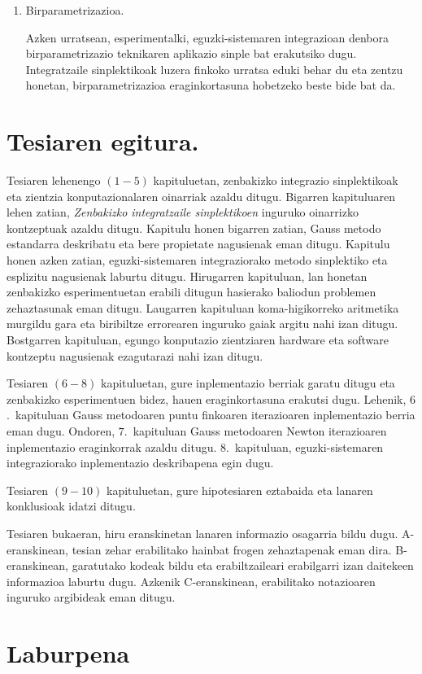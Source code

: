 \begin{enumerate}
\item Birparametrizazioa.

Azken urratsean, esperimentalki, eguzki-sistemaren integrazioan  denbora birparametrizazio teknikaren aplikazio sinple bat erakutsiko dugu. Integratzaile sinplektikoak luzera finkoko urratsa eduki behar du eta zentzu honetan, birparametrizazioa eraginkortasuna hobetzeko beste bide bat da.      

\end{enumerate}        


\section{Tesiaren egitura.}

Tesiaren lehenengo $(1-5)$ kapituluetan, zenbakizko integrazio sinplektikoak eta zientzia konputazionalaren oinarriak azaldu ditugu. Bigarren kapituluaren lehen zatian, \emph{Zenbakizko integratzaile sinplektikoen} inguruko oinarrizko kontzeptuak azaldu ditugu. Kapitulu honen bigarren zatian, Gauss metodo estandarra deskribatu eta bere propietate nagusienak eman ditugu. Kapitulu honen azken zatian, eguzki-sistemaren integraziorako metodo sinplektiko eta esplizitu nagusienak laburtu ditugu. Hirugarren kapituluan, lan honetan zenbakizko esperimentuetan erabili ditugun hasierako baliodun problemen zehaztasunak eman ditugu. Laugarren kapituluan koma-higikorreko aritmetika murgildu gara eta biribiltze errorearen inguruko gaiak argitu nahi izan ditugu. Bostgarren kapituluan, egungo konputazio zientziaren hardware eta software kontzeptu nagusienak ezagutarazi nahi izan ditugu.     

Tesiaren $(6-8)$ kapituluetan, gure inplementazio berriak garatu ditugu eta zenbakizko esperimentuen bidez, hauen eraginkortasuna erakutsi dugu. Lehenik, $6$.~kapituluan Gauss metodoaren puntu finkoaren iterazioaren inplementazio berria eman dugu. Ondoren, $7$.~kapituluan Gauss metodoaren Newton iterazioaren inplementazio eraginkorrak azaldu ditugu. $8$.~kapituluan, eguzki-sistemaren integraziorako inplementazio deskribapena egin dugu.  

Tesiaren $(9-10)$ kapituluetan, gure hipotesiaren eztabaida eta lanaren konklusioak idatzi ditugu.

Tesiaren bukaeran, hiru eranskinetan lanaren informazio osagarria bildu dugu. A-eranskinean, tesian zehar erabilitako hainbat frogen zehaztapenak eman dira. B-eranskinean, garatutako kodeak bildu eta erabiltzaileari erabilgarri izan daitekeen informazioa laburtu dugu. Azkenik C-eranskinean, erabilitako notazioaren inguruko argibideak eman ditugu.

      
      
\section{Laburpena}

